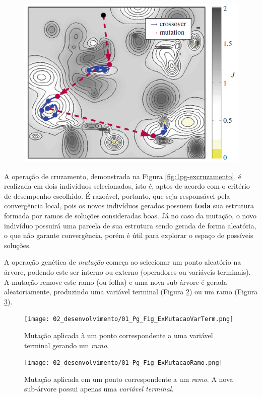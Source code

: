\begin{figure}[!!htb]
\centering
\includegraphics[width=0.7\linewidth]{02_desenvolvimento/01_Pg_Fig_GraficoBuscaExploration.png}
\label{fig:1pg-grafbuscaexpl}
\end{figure}

A operação de cruzamento, demonstrada na Figura \ref{fig:1pg-excruzamento}, é realizada em dois indivíduos selecionados, isto é, aptos de acordo com o critério de desempenho escolhido. É razoável, portanto, que seja responsável pela convergência local, pois os novos indivíduos gerados possuem \textbf{toda} sua estrutura formada por ramos de soluções consideradas boas. Já no caso da mutação, o novo indivíduo possuirá uma parcela de sua estrutura sendo gerada de forma aleatória, o que não garante convergência, porém é útil para explorar o espaço de possíveis soluções.

A operação genética de \textit{mutação} começa ao selecionar um ponto aleatório na árvore, podendo este ser interno ou externo (operadores ou variáveis terminais). A mutação remove este ramo (ou folha) e uma nova sub-árvore é gerada aleatoriamente, produzindo uma variável terminal (Figura \ref{fig:1pg-exmutvarterm}) ou um ramo (Figura \ref{fig:1pg-exmutramo}).

\begin{figure}[H]
\centering
\texttt{[image: 02\_desenvolvimento/01\_Pg\_Fig\_ExMutacaoVarTerm.png]}
\caption{Mutação aplicada à um ponto correspondente a uma variável terminal gerando um \textit{ramo}.}\label{fig:1pg-exmutvarterm}
\end{figure}

\begin{figure}[H]
\centering
\texttt{[image: 02\_desenvolvimento/01\_Pg\_Fig\_ExMutacaoRamo.png]}
\caption{Mutação aplicada em um ponto correspondente a um \textit{ramo}. A nova sub-árvore possui apenas uma \textit{variável terminal}.}\label{fig:1pg-exmutramo}
\end{figure}

